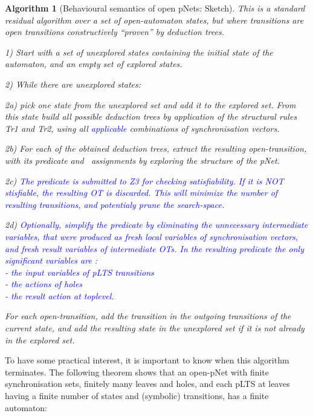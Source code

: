\documentclass{lncs/llncs}
\newcommand{\ERIC}[1]{\textcolor{blue}{#1}}
\newcommand{\Post}{\symb{Post}}
\newtheorem{algorithm}[theorem]{Algorithm}
\begin{document}
\begin{algorithm}[Behavioural semantics of open pNets: Sketch]
This is a standard residual algorithm over a set of open-automaton
states, but where transitions are open transitions
constructively ``proven'' by deduction trees.

1) Start with a set of unexplored states containing the initial state
of the automaton, and an empty set of explored states.

2) While there are unexplored states:

2a) pick one state from the unexplored set and add it to the explored
set. From this state
build all possible deduction trees by application of the structural
rules Tr1 and Tr2, using all \ERIC{applicable} combinations
of synchronisation vectors.

2b) For each of the obtained deduction trees, extract the resulting
open-transition, with its predicate and \Post\ assignments by exploring the structure of 
the pNet.

2c)
\ERIC{The predicate is submitted to Z3 for checking satisfiability. If it is NOT stisfiable, the resulting OT is discarded. This will minimize the number of
resulting transitions, and potentialy prune the search-space.}

2d)
\ERIC{Optionally, simplify the predicate by eliminating the unnecessary intermediate variables, that were produced as fresh local variables of synchronisation vectors, and fresh result variables of intermediate OTs. In the resulting predicate the only significant variables are :\\
- the input variables of pLTS transitions\\
- the actions of holes\\
- the result action at toplevel.}

For each open-transition,  add the transition in the outgoing transitions of
the current state, and add the
resulting state in the unexplored set if it is not already in the
explored set.

\end{algorithm}



To have some practical interest, it is important to know when this
algorithm terminates. The following theorem shows that an open-pNet
with finite synchronisation sets, finitely many leaves and
holes, and each pLTS at leaves having a finite number of states and
(symbolic) transitions, has a finite automaton:
\end{document}
